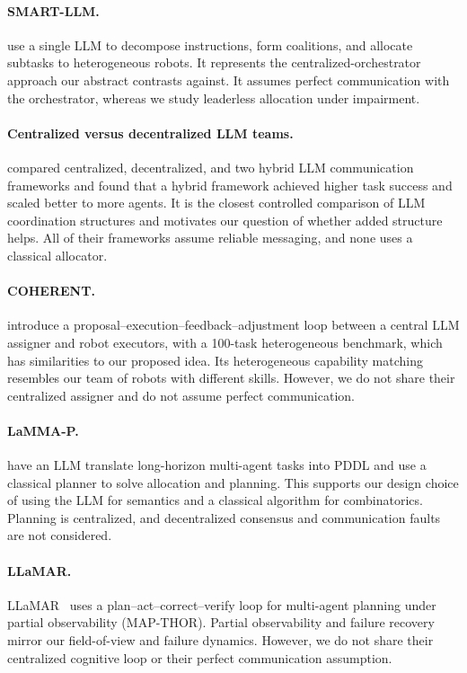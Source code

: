 \documentclass[letterpaper]{article}
\begin{document}
\paragraph{SMART-LLM.}
\citet{kannan2024smartllm} use a single LLM to decompose instructions, form coalitions, and allocate subtasks to heterogeneous robots. It represents the centralized-orchestrator approach our abstract contrasts against. It assumes perfect communication with the orchestrator, whereas we study leaderless allocation under impairment.

\paragraph{Centralized versus decentralized LLM teams.}
\citet{chen2024scalable} compared centralized, decentralized, and two hybrid LLM communication frameworks and found that a hybrid framework achieved higher task success and scaled better to more agents. It is the closest controlled comparison of LLM coordination structures and motivates our question of whether added structure helps. All of their frameworks assume reliable messaging, and none uses a classical allocator.

\paragraph{COHERENT.}
\citet{liu2025coherent} introduce a proposal--execution--feedback--adjustment loop between a central LLM assigner and robot executors, with a 100-task heterogeneous benchmark, which has similarities to our proposed idea. Its heterogeneous capability matching resembles our team of robots with different skills. However, we do not share their centralized assigner and do not assume perfect communication.

\paragraph{LaMMA-P.}
\citet{zhang2025lammap} have an LLM translate long-horizon multi-agent tasks into PDDL and use a classical planner to solve allocation and planning. This supports our design choice of using the LLM for semantics and a classical algorithm for combinatorics. Planning is centralized, and decentralized consensus and communication faults are not considered.

\paragraph{LLaMAR.}
LLaMAR~\citep{nayak2024llamar} uses a plan--act--correct--verify loop for multi-agent planning under partial observability (MAP-THOR). Partial observability and failure recovery mirror our field-of-view and failure dynamics. However, we do not share their centralized cognitive loop or their perfect communication assumption.
\end{document}
